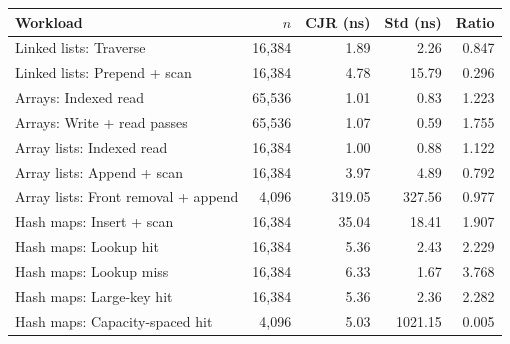 \begin{tabular}{@{}lrrrr@{}}
\hline
Workload & $n$ & CJR (ns) & Std (ns) & Ratio \\
\hline
Linked lists: Traverse & 16,384 & 1.89 & 2.26 & 0.847 \\
Linked lists: Prepend + scan & 16,384 & 4.78 & 15.79 & 0.296 \\
Arrays: Indexed read & 65,536 & 1.01 & 0.83 & 1.223 \\
Arrays: Write + read passes & 65,536 & 1.07 & 0.59 & 1.755 \\
Array lists: Indexed read & 16,384 & 1.00 & 0.88 & 1.122 \\
Array lists: Append + scan & 16,384 & 3.97 & 4.89 & 0.792 \\
Array lists: Front removal + append & 4,096 & 319.05 & 327.56 & 0.977 \\
Hash maps: Insert + scan & 16,384 & 35.04 & 18.41 & 1.907 \\
Hash maps: Lookup hit & 16,384 & 5.36 & 2.43 & 2.229 \\
Hash maps: Lookup miss & 16,384 & 6.33 & 1.67 & 3.768 \\
Hash maps: Large-key hit & 16,384 & 5.36 & 2.36 & 2.282 \\
Hash maps: Capacity-spaced hit & 4,096 & 5.03 & 1021.15 & 0.005 \\
\hline
\end{tabular}
